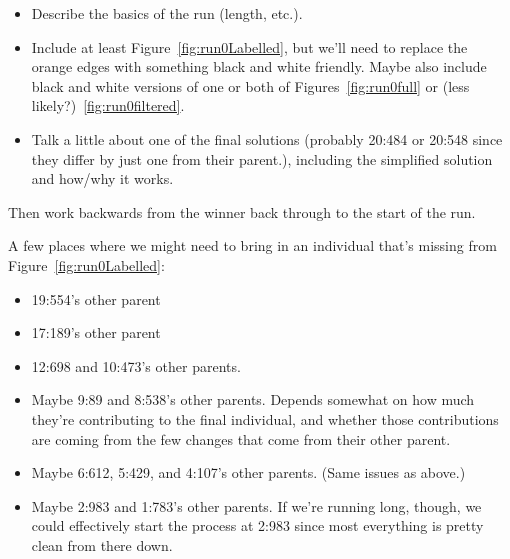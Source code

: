 \begin{itemize}
	\item Describe the basics of the run (length, etc.).
	\item Include at least Figure~\ref{fig:run0Labelled}, but we'll need to
	replace the orange edges with something black and white friendly. 
	Maybe also include 
	black and white versions of one or both of Figures~\ref{fig:run0full} or 
	(less likely?)~\ref{fig:run0filtered}.
	\item Talk a little about one of the final solutions (probably 20:484 or 20:548 since they differ by just one from their parent.), including the simplified solution and how/why it works.
\end{itemize}

Then work backwards from the winner back through to the start of the run. 

A few places where we might need to bring in an individual that's 
missing from Figure~\ref{fig:run0Labelled}:
\begin{itemize}
	\item 19:554's other parent
	\item 17:189's other parent
	\item 12:698 and 10:473's other parents.
	\item Maybe 9:89 and 8:538's other parents. Depends somewhat on how much
	they're contributing to the final individual, and whether those 
	contributions are coming from the few changes that come from their other
	parent.
	\item Maybe 6:612, 5:429, and 4:107's other parents. (Same issues as above.)
	\item Maybe 2:983 and 1:783's other parents. If we're running long, though, 
	we could effectively start the process at 2:983 since most everything is
	pretty clean from there down.
\end{itemize}


